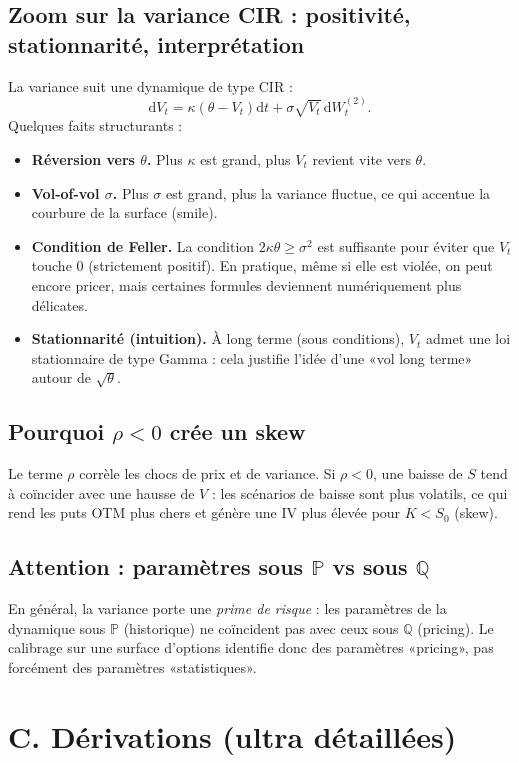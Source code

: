 \documentclass[11pt,a4paper]{report}
\theoremstyle{definition}
\theoremstyle{plain}
\theoremstyle{remark}
\newcommand{\dd}{\mathrm{d}}
\newcommand{\1}{\mathbf{1}}
\newcommand{\Pmeas}{\mathbb{P}}
\newcommand{\Qmeas}{\mathbb{Q}}
\begin{document}
\subsection*{Zoom sur la variance CIR : positivité, stationnarité, interprétation}
La variance suit une dynamique de type CIR :
\[
\dd V_t=\kappa(\theta-V_t)\dd t+\sigma\sqrt{V_t}\,\dd W_t^{(2)}.
\]
Quelques faits structurants :
\begin{itemize}[leftmargin=*]
\item \textbf{Réversion vers $\theta$.} Plus $\kappa$ est grand, plus $V_t$ revient vite vers $\theta$.
\item \textbf{Vol-of-vol $\sigma$.} Plus $\sigma$ est grand, plus la variance fluctue, ce qui accentue la courbure de la surface (smile).
\item \textbf{Condition de Feller.} La condition $2\kappa\theta\ge\sigma^2$ est suffisante pour éviter que $V_t$ touche 0 (strictement positif). En pratique, même si elle est violée, on peut encore pricer, mais certaines formules deviennent numériquement plus délicates.
\item \textbf{Stationnarité (intuition).} À long terme (sous conditions), $V_t$ admet une loi stationnaire de type Gamma : cela justifie l'idée d'une «vol long terme» autour de $\sqrt{\theta}$.
\end{itemize}

\subsection*{Pourquoi $\rho<0$ crée un skew}
Le terme $\rho$ corrèle les chocs de prix et de variance.
Si $\rho<0$, une baisse de $S$ tend à coïncider avec une hausse de $V$ : les scénarios de baisse sont plus volatils, ce qui rend les puts OTM plus chers et génère une IV plus élevée pour $K<S_0$ (skew).

\subsection*{Attention : paramètres sous $\Pmeas$ vs sous $\Qmeas$}
En général, la variance porte une \emph{prime de risque} : les paramètres de la dynamique sous $\Pmeas$ (historique) ne coïncident pas avec ceux sous $\Qmeas$ (pricing).
Le calibrage sur une surface d'options identifie donc des paramètres «pricing», pas forcément des paramètres «statistiques».



\section{C. Dérivations (ultra détaillées)}
\end{document}

